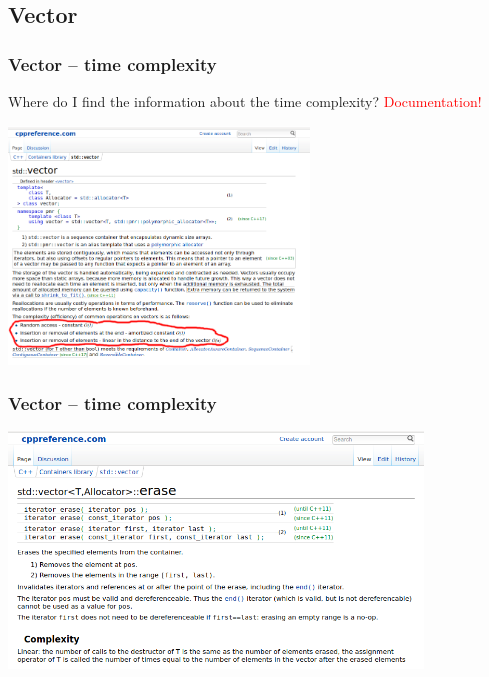 \documentclass{beamer}
\begin{document}
\subsection{Vector}

\begin{frame}
    \frametitle{Vector -- time complexity}
    Where do I find the information about the time complexity?
    \pause
    \textcolor{red}{Documentation!}

    \centering
    \includegraphics[width=8cm]{vector.png}
\end{frame}

\begin{frame}
    \frametitle{Vector -- time complexity}
    \includegraphics[width=11cm]{vector_erase.png}
\end{frame}
\end{document}
